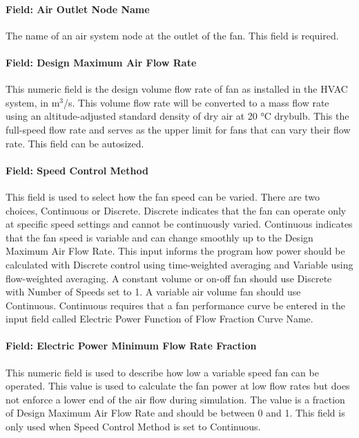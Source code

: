 \paragraph{Field: Air Outlet Node Name}\label{field-air-outlet-node-name-fansysmodel}

The name of an air system node at the outlet of the fan.  This field is required.

\paragraph{Field: Design Maximum Air Flow Rate}\label{field-design-air-flow-fansysmodel}

This numeric field is the design volume flow rate of fan as installed in the HVAC system, in m\(^{3}\)/s. This volume flow rate will be converted to a mass flow rate using an altitude-adjusted standard density of dry air at 20 °C drybulb. This the full-speed flow rate and serves as the upper limit for fans that can vary their flow rate. This field can be autosized.

\paragraph{Field: Speed Control Method}\label{field-speed-method-fansysmodel}

This field is used to select how the fan speed can be varied. There are two choices, Continuous or Discrete.  Discrete indicates that the fan can operate only at specific speed settings and cannot be continuously varied.  Continuous indicates that the fan speed is variable and can change smoothly up to the Design Maximum Air Flow Rate.  This input informs the program how power should be calculated with Discrete control using time-weighted averaging and Variable using flow-weighted averaging. A constant volume or on-off fan should use Discrete with Number of Speeds set to 1.  A variable air volume fan should use Continuous. Continuous requires that a fan performance curve be entered in the input field called Electric Power Function of Flow Fraction Curve Name.

\paragraph{Field: Electric Power Minimum Flow Rate Fraction}\label{field-power-min-flow-fraction-fansysmodel}

This numeric field is used to describe how low a variable speed fan can be operated. This value is used to calculate the fan power at low flow rates but does not enforce a lower end of the air flow during simulation. The value is a fraction of Design Maximum Air Flow Rate and should be between 0 and 1.  This field is only used when Speed Control Method is set to Continuous.

